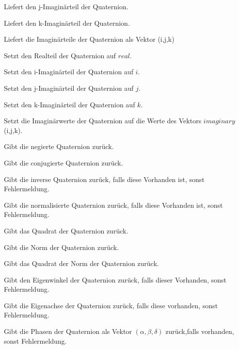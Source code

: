 \descr
{
Liefert den j-Imaginärteil der Quaternion.
}

\descr
{
Liefert den k-Imaginärteil der Quaternion.
}

\descr
{
Liefert die Imaginärteile der Quaternion als Vektor (i,j,k)
}

\descr
{
Setzt den Realteil der Quaternion auf $real$.
}

\descr
{
Setzt den i-Imaginärteil der Quaternion auf $i$.
}

\descr
{
Setzt den j-Imaginärteil der Quaternion auf $j$.
}

\descr
{
Setzt den k-Imaginärteil der Quaternion auf $k$.
}

\descr
{
Setzt die Imaginärwerte der Quaternion auf die Werte des Vektors $imaginary$ (i,j,k).
}

\descr
{
Gibt die negierte Quaternion zurück.
}

\descr
{
Gibt die conjugierte Quaternion zurück.
}

\descr
{
Gibt die inverse Quaternion zurück, falls diese Vorhanden ist, sonst Fehlermeldung.
}

\descr
{
Gibt die normalisierte Quaternion zurück, falls diese Vorhanden ist, sonst Fehlermeldung.
}

\descr
{
Gibt das Quadrat der Quaternion zurück.
}

\descr
{
Gibt die Norm der Quaternion zurück.
}

\descr
{
Gibt das Quadrat der Norm der Quaternion zurück.
}

\descr
{
Gibt den Eigenwinkel der Quaternion zurück, falls dieser Vorhanden, sonst Fehlermeldung.
}

\descr
{
Gibt die Eigenachse der Quaternion zurück, falls diese vorhanden, sonst Fehlermeldung.
}

\descr
{
Gibt die Phasen der Quaternion als Vektor $(\alpha,\beta,\delta) $ zurück,falls
vorhanden, sonst Fehlermeldung.
}

